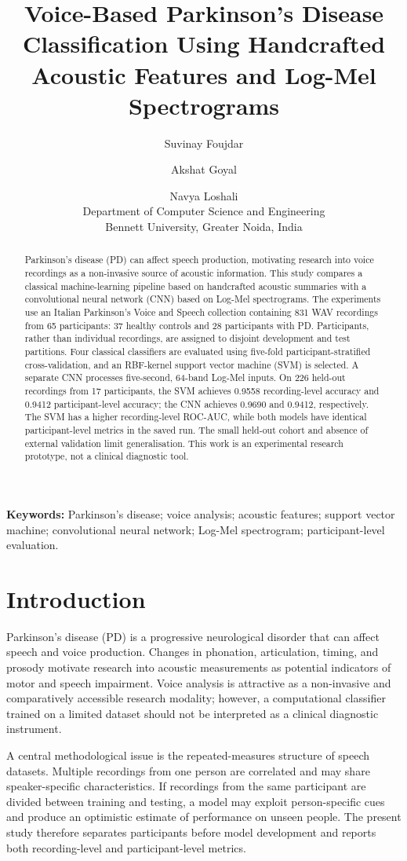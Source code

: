 \documentclass[11pt,a4paper]{article}
\title{\textbf{Voice-Based Parkinson's Disease Classification Using Handcrafted Acoustic Features and Log-Mel Spectrograms}}
\author{Suvinay Foujdar \and Akshat Goyal \and Navya Loshali\\
Department of Computer Science and Engineering\\Bennett University, Greater Noida, India}
\date{}
\begin{document}
\maketitle
\begin{abstract}
Parkinson's disease (PD) can affect speech production, motivating research into voice recordings as a non-invasive source of acoustic information. This study compares a classical machine-learning pipeline based on handcrafted acoustic summaries with a convolutional neural network (CNN) based on Log-Mel spectrograms. The experiments use an Italian Parkinson's Voice and Speech collection containing 831 WAV recordings from 65 participants: 37 healthy controls and 28 participants with PD. Participants, rather than individual recordings, are assigned to disjoint development and test partitions. Four classical classifiers are evaluated using five-fold participant-stratified cross-validation, and an RBF-kernel support vector machine (SVM) is selected. A separate CNN processes five-second, 64-band Log-Mel inputs. On 226 held-out recordings from 17 participants, the SVM achieves 0.9558 recording-level accuracy and 0.9412 participant-level accuracy; the CNN achieves 0.9690 and 0.9412, respectively. The SVM has a higher recording-level ROC-AUC, while both models have identical participant-level metrics in the saved run. The small held-out cohort and absence of external validation limit generalisation. This work is an experimental research prototype, not a clinical diagnostic tool.
\end{abstract}
\noindent\textbf{Keywords:} Parkinson's disease; voice analysis; acoustic features; support vector machine; convolutional neural network; Log-Mel spectrogram; participant-level evaluation.

\section{Introduction}
Parkinson's disease (PD) is a progressive neurological disorder that can affect speech and voice production. Changes in phonation, articulation, timing, and prosody motivate research into acoustic measurements as potential indicators of motor and speech impairment. Voice analysis is attractive as a non-invasive and comparatively accessible research modality; however, a computational classifier trained on a limited dataset should not be interpreted as a clinical diagnostic instrument.

A central methodological issue is the repeated-measures structure of speech datasets. Multiple recordings from one person are correlated and may share speaker-specific characteristics. If recordings from the same participant are divided between training and testing, a model may exploit person-specific cues and produce an optimistic estimate of performance on unseen people. The present study therefore separates participants before model development and reports both recording-level and participant-level metrics.
\end{document}
